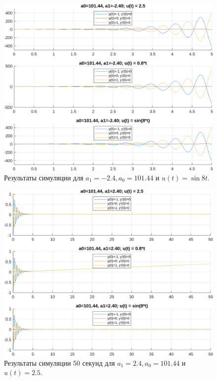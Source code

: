 \begin{figure}
    \centering
    \includegraphics[width=1\textwidth]{figs/task_1_out_3.png}
    \caption{Результаты симуляции для $a_1 = -2.4, a_0 = 101.44$ и $u(t) = \sin 8t$.}
    \label{fig:task_1_out_3}
\end{figure}

\begin{figure}
    \centering
    \includegraphics[width=1\textwidth]{figs/task_1_out_11.png}
    \caption{Результаты симуляции 50 секунд для $a_1 = 2.4, a_0 = 101.44$ и $u(t) = 2.5$.}
    \label{fig:task_1_out_11}
\end{figure}

